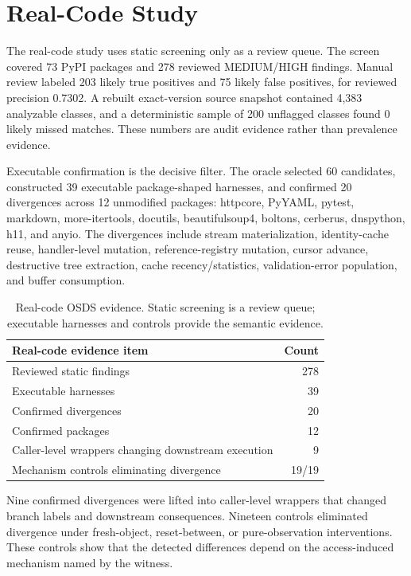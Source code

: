 \section{Real-Code Study}

The real-code study uses static screening only as a review queue. The screen covered 73 PyPI packages and 278 reviewed MEDIUM/HIGH findings. Manual review labeled 203 likely true positives and 75 likely false positives, for reviewed precision 0.7302. A rebuilt exact-version source snapshot contained 4,383 analyzable classes, and a deterministic sample of 200 unflagged classes found 0 likely missed matches. These numbers are audit evidence rather than prevalence evidence.

Executable confirmation is the decisive filter. The oracle selected 60 candidates, constructed 39 executable package-shaped harnesses, and confirmed 20 divergences across 12 unmodified packages: httpcore, PyYAML, pytest, markdown, more-itertools, docutils, beautifulsoup4, boltons, cerberus, dnspython, h11, and anyio. The divergences include stream materialization, identity-cache reuse, handler-level mutation, reference-registry mutation, cursor advance, destructive tree extraction, cache recency/statistics, validation-error population, and buffer consumption.

\begin{table}[t]
\centering
\small
\begin{tabular}{lr}
\toprule
Real-code evidence item & Count \\
\midrule
Reviewed static findings & 278 \\
Executable harnesses & 39 \\
Confirmed divergences & 20 \\
Confirmed packages & 12 \\
Caller-level wrappers changing downstream execution & 9 \\
Mechanism controls eliminating divergence & 19/19 \\
\bottomrule
\end{tabular}
\caption{Real-code OSDS evidence. Static screening is a review queue; executable harnesses and controls provide the semantic evidence.}
\label{tab:real-code}
\end{table}

Nine confirmed divergences were lifted into caller-level wrappers that changed branch labels and downstream consequences. Nineteen controls eliminated divergence under fresh-object, reset-between, or pure-observation interventions. These controls show that the detected differences depend on the access-induced mechanism named by the witness.
